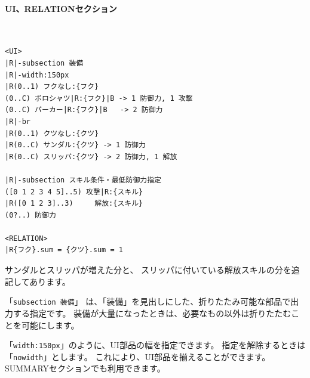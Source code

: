 \documentclass[dvipdfmx]{jsarticle}
\begin{document}
\paragraph{UI、RELATIONセクション}~\medskip
{\footnotesize\begin{mdframed}\begin{Verbatim}[commandchars=|<>]
<UI>
|R|-subsection 装備
|R|-width:150px
|R(0..1) フクなし:{フク}
(0..C) ポロシャツ|R:{フク}|B -> 1 防御力, 1 攻撃
(0..C) パーカー|R:{フク}|B   -> 2 防御力
|R|-br
|R(0..1) クツなし:{クツ}
|R(0..C) サンダル:{クツ} -> 1 防御力
|R(0..C) スリッパ:{クツ} -> 2 防御力, 1 解放

|R|-subsection スキル条件・最低防御力指定
([0 1 2 3 4 5]..5) 攻撃|R:{スキル}
|R([0 1 2 3]..3)     解放:{スキル}
(0?..) 防御力

<RELATION>
|R{フク}.sum = {クツ}.sum = 1
\end{Verbatim}
\end{mdframed}}
\medskip

サンダルとスリッパが増えた分と、
スリッパに付いている解放スキルの分を追記してあります。

「\texttt{subsection 装備}」
は、「装備」を見出しにした、折りたたみ可能な部品で出力する指定です。
装備が大量になったときは、必要なもの以外は折りたたむことを可能にします。

「\texttt{width:150px}」のように、UI部品の幅を指定できます。
指定を解除するときは「\texttt{nowidth}」とします。
これにより、UI部品を揃えることができます。
SUMMARYセクションでも利用できます。

\begin{center}
\end{center}
\end{document}
